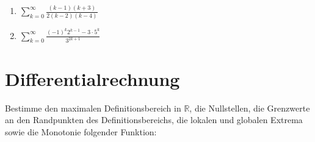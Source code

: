 \documentclass[11pt, a4paper]{article}
\newcommand{\abs}[1]{\left\lvert#1\right\rvert}
\newif\ifshowsolution
\begin{document}
\begin{enumerate}
	\item $\sum_{k=0}^\infty \frac{(k-1)(k+3)}{2(k-2)(k-4)}$
		\ifshowsolution
			\begin{align*}
				\sum_{k=0}^\infty \frac{(k-1)(k+3)}{2(k-2)(k-4)} &= \sum_{k=0}^\infty \frac{k^2 + 2k - 3}{2(k^2 - 6k + 8)} \\
				&= \sum_{k=0}^\infty \frac{k^2 + 2k - 3}{2k^2 - 12k + 16}
			\end{align*}
			Die Reihe ist divergent, da $\lim_{k \mapsto \infty} a_k = \frac{1}{2} \neq 0$, wobei $a_k$ die Reihenglieder sind.
		\fi
	\item $\sum_{k=0}^\infty \frac{(-1)^k 2^{k-1} - 3 \cdot 5^k}{3^{2k+1}}$
		\ifshowsolution
			\begin{align*}
				\intertext{Wir konzentrieren uns zunächst auf die Reihenglieder}
				a_k = \frac{(-1)^k 2^{k-1} - 3 \cdot 5^k}{3^{2k+1}} &= \frac{(-1)^k \frac{2^k}{2} - \frac{3\cdot2}{2} \cdot 5^k}{3^{2k} \cdot 3} \\
				&= \frac{(-1)^k 2^k - 6 \cdot 5^k}{3^{2k} \cdot 6} \\
				&= \frac{(-2)^k - 6 \cdot 5^k}{9^k \cdot 6} \\
				&= \frac{(-2)^k}{9^k \cdot 6} - \frac{\cancel{6} \cdot 5^k}{9^k \cdot \cancel{6}} \\
				&= \frac{1}{6} \cdot \left(\frac{-2}{9}\right)^k - \left(\frac{5}{9}\right)^k
				\intertext{Zurück zur Reihe}
				\sum_{k=0}^\infty \frac{(-1)^k 2^{k-1} - 6 \cdot 5^k}{3^{2k+1}} &= \sum_{k=0}^\infty \frac{1}{6} \cdot \left(\frac{-2}{9}\right)^k - \left(\frac{5}{9}\right)^k \\
				&= \frac{1}{6} \underbrace{\sum_{k=0}^\infty \left(\frac{-2}{9}\right)^k}_{\text{geom. Reihe}} - \underbrace{\sum_{k=0}^\infty \left(\frac{5}{9}\right)^k}_{\text{geom. Reihe}}
				\intertext{Für die geometrische Reihe gilt $\sum_{k=0}^\infty q^k = \frac{1}{1-q}$ bei $\abs{q} < 1$}
				= \frac{1}{6} \sum_{k=0}^\infty \left(\frac{-2}{9}\right)^k - \sum_{k=0}^\infty \left(\frac{5}{9}\right)^k &= \frac{1}{6} \cdot \frac{1}{1 - \frac{-2}{9}} - \frac{1}{1 - \frac{5}{9}} \\
				&= \frac{1}{6} \cdot \frac{1}{\frac{11}{9}} - \frac{1}{\frac{4}{9}} \\
				&= - \frac{93}{44}
			\end{align*}
		\fi
\end{enumerate}

\newpage
\section{Differentialrechnung} %
Bestimme den maximalen Definitionsbereich in $\mathbb{R}$, die Nullstellen, die Grenzwerte an den Randpunkten des Definitionsbereichs, die lokalen und globalen Extrema sowie die Monotonie folgender Funktion:
\end{document}
